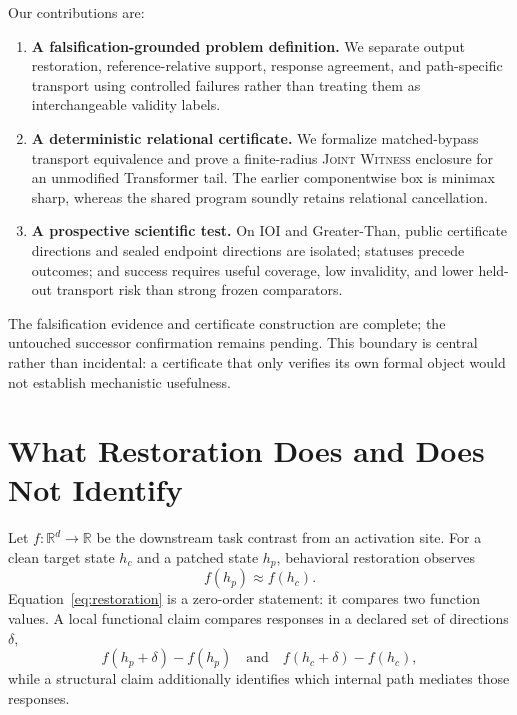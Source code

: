 \documentclass{article}
\newcommand{\R}{\mathbb{R}}
\newcommand{\JW}{\textsc{Joint Witness}}
\begin{document}
Our contributions are:
\begin{enumerate}[leftmargin=*,itemsep=2pt,topsep=3pt]
    \item \textbf{A falsification-grounded problem definition.} We separate output restoration, reference-relative support, response agreement, and path-specific transport using controlled failures rather than treating them as interchangeable validity labels.
    \item \textbf{A deterministic relational certificate.} We formalize matched-bypass transport equivalence and prove a finite-radius \JW{} enclosure for an unmodified Transformer tail. The earlier componentwise box is minimax sharp, whereas the shared program soundly retains relational cancellation.
    \item \textbf{A prospective scientific test.} On IOI and Greater-Than, public certificate directions and sealed endpoint directions are isolated; statuses precede outcomes; and success requires useful coverage, low invalidity, and lower held-out transport risk than strong frozen comparators.
\end{enumerate}
The falsification evidence and certificate construction are complete; the untouched successor confirmation remains pending. This boundary is central rather than incidental: a certificate that only verifies its own formal object would not establish mechanistic usefulness.

\section{What Restoration Does and Does Not Identify}
\label{sec:problem}

Let $f:\R^d\rightarrow\R$ be the downstream task contrast from an activation site. For a clean target state $h_c$ and a patched state $h_p$, behavioral restoration observes
\begin{equation}
    f(h_p)\approx f(h_c).
    \label{eq:restoration}
\end{equation}
Equation~\ref{eq:restoration} is a zero-order statement: it compares two function values. A local functional claim compares responses in a declared set of directions $\delta$,
\begin{equation}
    f(h_p+\delta)-f(h_p)
    \quad\text{and}\quad
    f(h_c+\delta)-f(h_c),
    \label{eq:response}
\end{equation}
while a structural claim additionally identifies which internal path mediates those responses.
\end{document}
